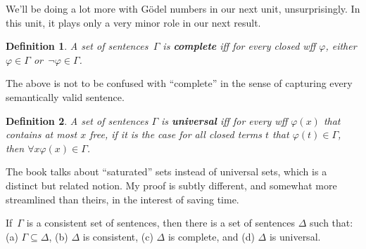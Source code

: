 \documentclass[12pt]{report}
\theoremstyle{nonumberplain}
\newtheorem{definition}{Definition}
\newcommand{\defm}[1]{\textbf{#1}\index{#1}}
\begin{document}
\noindent We'll be doing a lot more with Gödel numbers in our next unit, unsurprisingly. In this unit, it plays only a very minor role in our next result.

\begin{definition}\label{completedef}
A set of sentences \,$Γ$ is \defm{complete} iff for every closed wff $φ$, either $φ ∈Γ$ or \,$¬φ ∈Γ$.
\end{definition}

\noindent The above is not to be confused with ``complete'' in the sense of capturing every semantically valid sentence.

\begin{definition}
A set of sentences $Γ$ is \defm{universal} iff for every wff $φ(x)$ that contains at most $x$ free, if it is the case for all closed terms $t$ that $φ(t) ∈Γ$, then $∀x φ(x) ∈Γ$.
\end{definition}

\noindent The book talks about ``saturated'' sets instead of universal sets, which is a distinct but related notion. My proof is subtly different, and somewhat more streamlined than theirs, in the interest of saving time.

\begin{mt}
If \,$Γ$ is a consistent set of sentences, then there is a set of sentences $Δ$ such that: (a) $Γ ⊆ Δ$, (b) $Δ$ is consistent, (c) $Δ$ is complete, and (d) $Δ$ is universal.
\end{mt}
\end{document}
